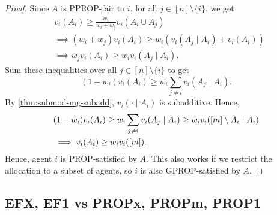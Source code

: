 \begin{proof}
Since $A$ is PPROP-fair to $i$, for all $j \in [n] \setminus \{i\}$, we get
\begin{align*}
& v_i(A_i) \ge \frac{w_i}{w_i + w_j}v_i(A_i \cup A_j)
\\ &\implies (w_i+w_j)v_i(A_i) \ge w_i(v_i(A_j \mid A_i) + v_i(A_i))
\\ &\implies w_j v_i(A_i) \ge w_i v_i(A_j \mid A_i).
\end{align*}
Sum these inequalities over all $j \in [n] \setminus \{i\}$ to get
\[ (1-w_i) v_i(A_i) \ge w_i \sum_{j \neq i} v_i(A_j \mid A_i). \]
By \cref{thm:submod-mg-subadd}, $v_i(\cdot \mid A_i)$ is subadditive. Hence,
\ifColsTwo\providecommand{\tempWrap}{\\ &\qquad}\else\let\tempWrap\relax\fi
\begin{align*}
& (1-w_i) v_i(A_i) \ge w_i \sum_{j \neq i} v_i(A_j \mid A_i)
    \tempWrap\ge w_i v_i([m] \setminus A_i \mid A_i)
\\ &\implies v_i(A_i) \ge w_i v_i([m]).
\end{align*}
Hence, agent $i$ is PROP-satisfied by $A$.
This also works if we restrict the allocation to a subset of agents,
so $i$ is also GPROP-satisfied by $A$.
\end{proof}

\subsection{EFX, EF1 vs PROPx, PROPm, PROP1}
\label{sec:impls-extra:efx-ef1-vs-propx-propm-prop1}


